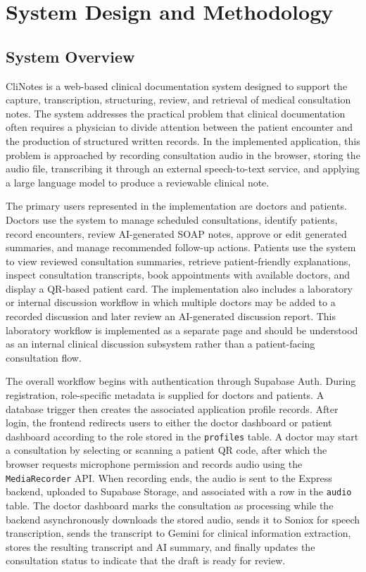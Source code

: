 \chapter{System Design and Methodology}
\label{chap:system-design-methodology}

\section{System Overview}
\label{sec:system-overview}

CliNotes is a web-based clinical documentation system designed to support the capture, transcription, structuring, review, and retrieval of medical consultation notes. The system addresses the practical problem that clinical documentation often requires a physician to divide attention between the patient encounter and the production of structured written records. In the implemented application, this problem is approached by recording consultation audio in the browser, storing the audio file, transcribing it through an external speech-to-text service, and applying a large language model to produce a reviewable clinical note.

The primary users represented in the implementation are doctors and patients. Doctors use the system to manage scheduled consultations, identify patients, record encounters, review AI-generated SOAP notes, approve or edit generated summaries, and manage recommended follow-up actions. Patients use the system to view reviewed consultation summaries, retrieve patient-friendly explanations, inspect consultation transcripts, book appointments with available doctors, and display a QR-based patient card. The implementation also includes a laboratory or internal discussion workflow in which multiple doctors may be added to a recorded discussion and later review an AI-generated discussion report. This laboratory workflow is implemented as a separate page and should be understood as an internal clinical discussion subsystem rather than a patient-facing consultation flow.

The overall workflow begins with authentication through Supabase Auth. During registration, role-specific metadata is supplied for doctors and patients. A database trigger then creates the associated application profile records. After login, the frontend redirects users to either the doctor dashboard or patient dashboard according to the role stored in the \texttt{profiles} table. A doctor may start a consultation by selecting or scanning a patient QR code, after which the browser requests microphone permission and records audio using the \texttt{MediaRecorder} API. When recording ends, the audio is sent to the Express backend, uploaded to Supabase Storage, and associated with a row in the \texttt{audio} table. The doctor dashboard marks the consultation as processing while the backend asynchronously downloads the stored audio, sends it to Soniox for speech transcription, sends the transcript to Gemini for clinical information extraction, stores the resulting transcript and AI summary, and finally updates the consultation status to indicate that the draft is ready for review.

